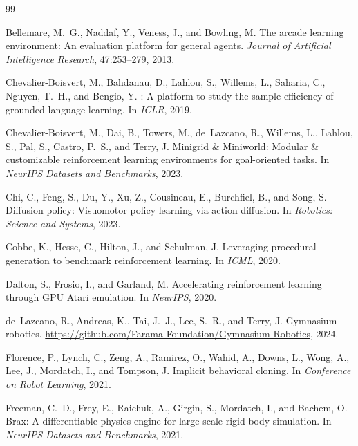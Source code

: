 \documentclass{article}
\begin{document}
\begin{thebibliography}{99}
\raggedright
\setlength{\itemsep}{1pt}\setlength{\parsep}{0pt}
\providecommand{\natexlab}[1]{#1}

Bellemare, M.~G., Naddaf, Y., Veness, J., and Bowling, M.
\newblock The arcade learning environment: An evaluation platform for general
  agents.
\newblock \emph{Journal of Artificial Intelligence Research}, 47:253--279,
  2013.

Chevalier-Boisvert, M., Bahdanau, D., Lahlou, S., Willems, L., Saharia, C.,
  Nguyen, T.~H., and Bengio, Y.
: A platform to study the sample efficiency of grounded
  language learning.
\newblock In \emph{ICLR}, 2019.

Chevalier-Boisvert, M., Dai, B., Towers, M., de~Lazcano, R., Willems, L.,
  Lahlou, S., Pal, S., Castro, P.~S., and Terry, J.
\newblock Minigrid \& Miniworld: Modular \& customizable reinforcement learning
  environments for goal-oriented tasks.
\newblock In \emph{NeurIPS Datasets and Benchmarks}, 2023.

Chi, C., Feng, S., Du, Y., Xu, Z., Cousineau, E., Burchfiel, B., and Song, S.
\newblock Diffusion policy: Visuomotor policy learning via action diffusion.
\newblock In \emph{Robotics: Science and Systems}, 2023.

Cobbe, K., Hesse, C., Hilton, J., and Schulman, J.
\newblock Leveraging procedural generation to benchmark reinforcement learning.
\newblock In \emph{ICML}, 2020.

Dalton, S., Frosio, I., and Garland, M.
\newblock Accelerating reinforcement learning through {GPU} {A}tari emulation.
\newblock In \emph{NeurIPS}, 2020.

de~Lazcano, R., Andreas, K., Tai, J.~J., Lee, S.~R., and Terry, J.
\newblock Gymnasium robotics.
\newblock \url{https://github.com/Farama-Foundation/Gymnasium-Robotics}, 2024.

Florence, P., Lynch, C., Zeng, A., Ramirez, O., Wahid, A., Downs, L., Wong, A.,
  Lee, J., Mordatch, I., and Tompson, J.
\newblock Implicit behavioral cloning.
\newblock In \emph{Conference on Robot Learning}, 2021.

Freeman, C.~D., Frey, E., Raichuk, A., Girgin, S., Mordatch, I., and Bachem, O.
\newblock Brax: A differentiable physics engine for large scale rigid body
  simulation.
\newblock In \emph{NeurIPS Datasets and Benchmarks}, 2021.


\end{thebibliography}
\end{document}

